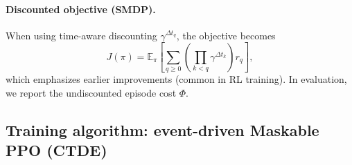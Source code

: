 \documentclass[preprint, 3p, review, 12pt]{elsarticle}
\begin{document}
\paragraph{Discounted objective (SMDP).}
When using time-aware discounting $\gamma^{\Delta t_q}$, the objective becomes
\[
J(\pi)=\mathbb{E}_{\pi}\!\left[\sum_{q\ge 0}\left(\prod_{k<q}\gamma^{\Delta t_k}\right) r_q\right],
\]
which emphasizes earlier improvements (common in RL training). In evaluation, we report the undiscounted episode cost $\Phi$.

\subsection{Training algorithm: event-driven Maskable PPO (CTDE)}
\end{document}
